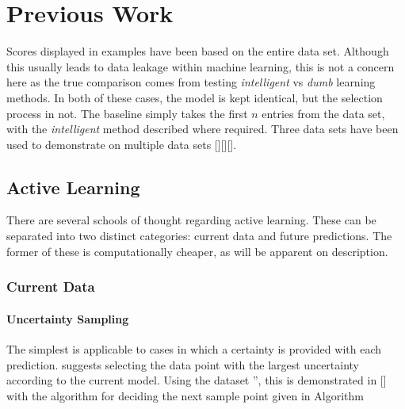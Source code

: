 
\chapter{Previous Work}

\ifpdf
  \graphicspath{{Chapter2/Figs/Raster/}{Chapter2/Figs/PDF/}{Chapter2/Figs/}}
\else
  \graphicspath{{Chapter2/Figs/Vector/}{Chapter2/Figs/}}
\fi


Scores displayed in examples have been based on the entire data set. Although this usually leads to data leakage within machine learning, this is not a concern here as the true comparison comes from testing  \textit{intelligent} vs \textit{dumb} learning methods. In both of these cases, the model is kept identical, but the selection process in not. The baseline simply takes the first $n$ entries from the data set, with the \textit{intelligent} method described where required. Three data sets have been used to demonstrate on multiple data sets [][][].

\section{Active Learning}\label{ch:Active Learning}
There are several schools of thought regarding active learning. These can be separated into two distinct categories: current data and future predictions. The former of these is computationally cheaper, as will be apparent on description.

\subsection{Current Data}
\subsubsection{Uncertainty Sampling}\label{sec:Uncertainty Sampling}
The simplest is applicable to cases in which a certainty is provided with each prediction. \textcite{Set09} suggests selecting the data point with the largest uncertainty according to the current model. Using the dataset '', this is demonstrated in [] with the algorithm for deciding the next sample point given in Algorithm

